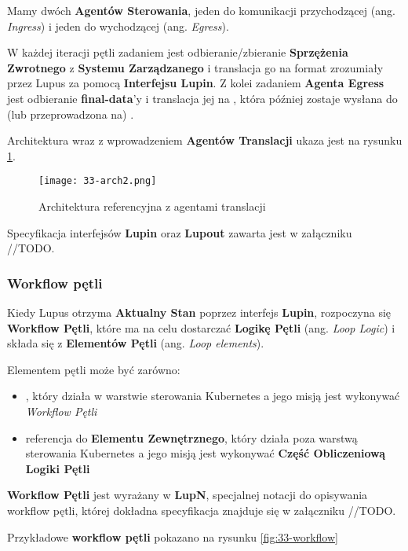 Mamy dwóch \textbf{Agentów Sterowania}, jeden do komunikacji przychodzącej (ang. \textit{Ingress}) i jeden do wychodzącej (ang. \textit{Egress}). 

W każdej iteracji pętli zadaniem  jest odbieranie/zbieranie \textbf{Sprzężenia Zwrotnego} z \textbf{Systemu Zarządzanego} i translacja go na format zrozumiały przez Lupus za pomocą \textbf{Interfejsu Lupin}. Z kolei zadaniem \textbf{Agenta Egress} jest odbieranie \textbf{final-data}'y i translacja jej na , która później zostaje wysłana do (lub przeprowadzona na) .

Architektura wraz z wprowadzeniem \textbf{Agentów Translacji} ukaza jest na rysunku \ref{fig:33-arch2}.

\begin{figure}[!h]
    \centering \texttt{[image: 33-arch2.png]}
    \caption{Architektura referencyjna z agentami translacji}\label{fig:33-arch2}
\end{figure}

Specyfikacja interfejsów \textbf{Lupin} oraz \textbf{Lupout} zawarta jest w załączniku //TODO.

\subsubsection{Workflow pętli}

Kiedy Lupus otrzyma \textbf{Aktualny Stan} poprzez interfejs \textbf{Lupin}, rozpoczyna się \textbf{Workflow Pętli}, które ma na celu dostarczać \textbf{Logikę Pętli} (ang. \textit{Loop Logic}) i składa się z \textbf{Elementów Pętli} (ang. \textit{Loop elements}). 

Elementem pętli może być zarówno:
\begin{itemize}
    \item {}, który działa w warstwie sterowania Kubernetes a jego misją jest wykonywać \textit{Workflow Pętli}
    \item referencja do \textbf{Elementu Zewnętrznego}, który działa poza warstwą sterowania Kubernetes a jego misją jest wykonywać \textbf{Część Obliczeniową} \textbf{Logiki Pętli}
\end{itemize}

\textbf{Workflow Pętli} jest wyrażany w \textbf{LupN}, specjalnej notacji do opisywania workflow pętli, której dokładna specyfikacja znajduje się w załączniku //TODO.

Przykładowe \textbf{workflow pętli} pokazano na rysunku \ref{fig:33-workflow}

